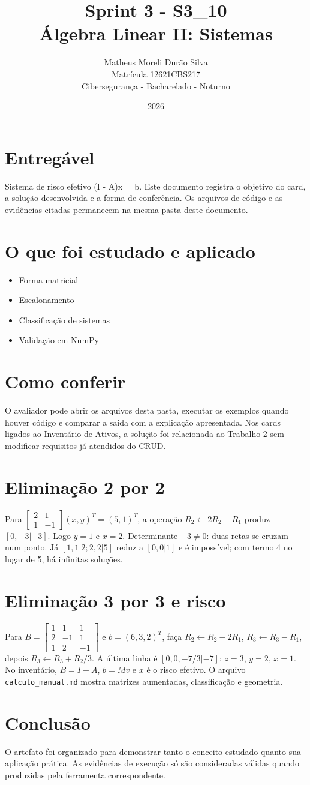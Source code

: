 \documentclass[12pt]{article}
\title{Sprint 3 - S3\_10\\Álgebra Linear II: Sistemas}
\author{Matheus Moreli Durão Silva\\Matrícula 12621CBS217\\Cibersegurança - Bacharelado - Noturno}
\date{2026}
\begin{document}
\maketitle

\section*{Entregável}
Sistema de risco efetivo (I - A)x = b. Este documento registra o objetivo do card, a solução desenvolvida e a forma de conferência. Os arquivos de código e as evidências citadas permanecem na mesma pasta deste documento.

\section*{O que foi estudado e aplicado}
\begin{itemize}
\item Forma matricial
\item Escalonamento
\item Classificação de sistemas
\item Validação em NumPy
\end{itemize}

\section*{Como conferir}
O avaliador pode abrir os arquivos desta pasta, executar os exemplos quando houver código e comparar a saída com a explicação apresentada. Nos cards ligados ao Inventário de Ativos, a solução foi relacionada ao Trabalho 2 sem modificar requisitos já atendidos do CRUD.

\section*{Eliminação 2 por 2}
Para $\left[\begin{smallmatrix}2&1\\1&-1\end{smallmatrix}\right](x,y)^T=(5,1)^T$, a operação $R_2\leftarrow2R_2-R_1$ produz $[0,-3|-3]$. Logo $y=1$ e $x=2$. Determinante $-3\neq0$: duas retas se cruzam num ponto. Já $[1,1|2;2,2|5]$ reduz a $[0,0|1]$ e é impossível; com termo 4 no lugar de 5, há infinitas soluções.
\section*{Eliminação 3 por 3 e risco}
Para $B=\left[\begin{smallmatrix}1&1&1\\2&-1&1\\1&2&-1\end{smallmatrix}\right]$ e $b=(6,3,2)^T$, faça $R_2\leftarrow R_2-2R_1$, $R_3\leftarrow R_3-R_1$, depois $R_3\leftarrow R_3+R_2/3$. A última linha é $[0,0,-7/3|-7]$: $z=3$, $y=2$, $x=1$. No inventário, $B=I-A$, $b=Mv$ e $x$ é o risco efetivo. O arquivo \texttt{calculo\_manual.md} mostra matrizes aumentadas, classificação e geometria.
\section*{Conclusão}
O artefato foi organizado para demonstrar tanto o conceito estudado quanto sua aplicação prática. As evidências de execução só são consideradas válidas quando produzidas pela ferramenta correspondente.
\end{document}
